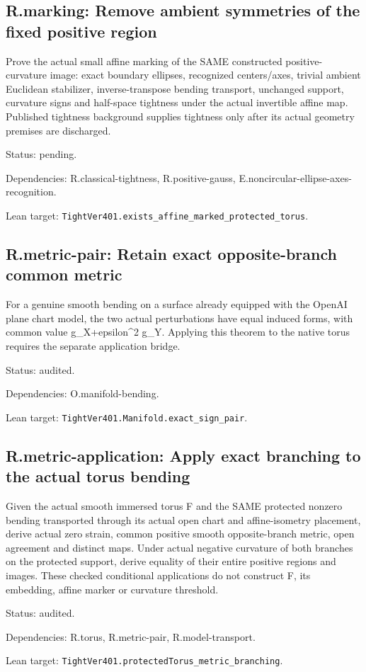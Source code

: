 \documentclass{article}
\begin{document}
\subsection*{R.marking: Remove ambient symmetries of the fixed positive region}
Prove the actual small affine marking of the SAME constructed positive-curvature image: exact boundary ellipses, recognized centers/axes, trivial ambient Euclidean stabilizer, inverse-transpose bending transport, unchanged support, curvature signs and half-space tightness under the actual invertible affine map. Published tightness background supplies tightness only after its actual geometry premises are discharged.
\par Status: pending.
\par Dependencies: R.classical-tightness, R.positive-gauss, E.noncircular-ellipse-axes-recognition.
\par Lean target: \texttt{TightVer401.exists\_affine\_marked\_protected\_torus}.
\subsection*{R.metric-pair: Retain exact opposite-branch common metric}
For a genuine smooth bending on a surface already equipped with the OpenAI plane chart model, the two actual perturbations have equal induced forms, with common value g\_X+epsilon^2 g\_Y. Applying this theorem to the native torus requires the separate application bridge.
\par Status: audited.
\par Dependencies: O.manifold-bending.
\par Lean target: \texttt{TightVer401.Manifold.exact\_sign\_pair}.
\subsection*{R.metric-application: Apply exact branching to the actual torus bending}
Given the actual smooth immersed torus F and the SAME protected nonzero bending transported through its actual open chart and affine-isometry placement, derive actual zero strain, common positive smooth opposite-branch metric, open agreement and distinct maps. Under actual negative curvature of both branches on the protected support, derive equality of their entire positive regions and images. These checked conditional applications do not construct F, its embedding, affine marker or curvature threshold.
\par Status: audited.
\par Dependencies: R.torus, R.metric-pair, R.model-transport.
\par Lean target: \texttt{TightVer401.protectedTorus\_metric\_branching}.
\end{document}
